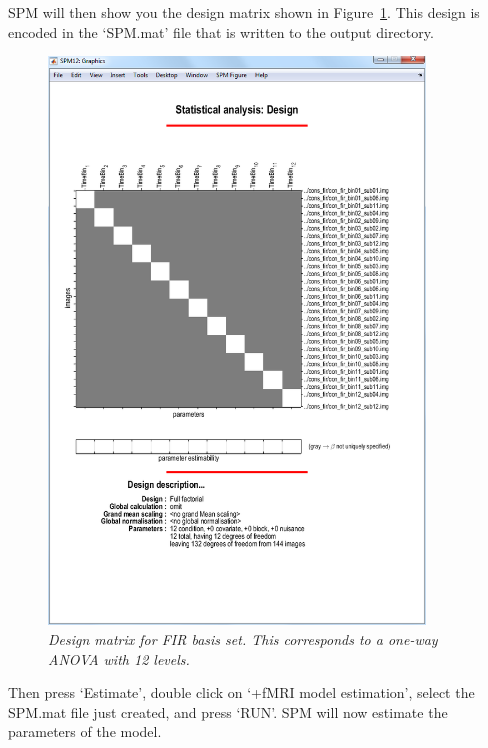 SPM will then show you the design matrix shown in Figure~\ref{fir_design}. This design is encoded in the `SPM.mat' file that is written to the output directory.
\begin{figure}
\begin{center}
\includegraphics[width=100mm]{fir_design}
\caption{\em Design matrix for FIR basis set. This corresponds to a one-way ANOVA with 12 levels. \label{fir_design}}
\end{center}
\end{figure}
Then press `Estimate', double click on `+fMRI model   estimation', select the SPM.mat file just created, and press `RUN'.
SPM will now estimate the parameters of the model.

